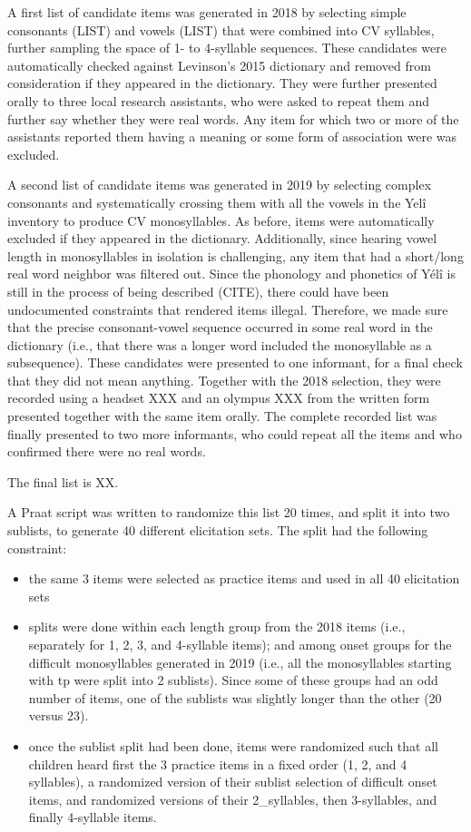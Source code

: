 \documentclass[english,,man,floatsintext]{apa6}
\providecommand{\tightlist}{%
  \setlength{\itemsep}{0pt}\setlength{\parskip}{0pt}}
\begin{document}
A first list of candidate items was generated in 2018 by selecting simple consonants (LIST) and vowels (LIST) that were combined into CV syllables, further sampling the space of 1- to 4-syllable sequences. These candidates were automatically checked against Levinson's 2015 dictionary and removed from consideration if they appeared in the dictionary. They were further presented orally to three local research assistants, who were asked to repeat them and further say whether they were real words. Any item for which two or more of the assistants reported them having a meaning or some form of association were was excluded.

A second list of candidate items was generated in 2019 by selecting complex consonants and systematically crossing them with all the vowels in the Yelî inventory to produce CV monosyllables. As before, items were automatically excluded if they appeared in the dictionary. Additionally, since hearing vowel length in monosyllables in isolation is challenging, any item that had a short/long real word neighbor was filtered out. Since the phonology and phonetics of Yélî is still in the process of being described (CITE), there could have been undocumented constraints that rendered items illegal. Therefore, we made sure that the precise consonant-vowel sequence occurred in some real word in the dictionary (i.e., that there was a longer word included the monosyllable as a subsequence). These candidates were presented to one informant, for a final check that they did not mean anything. Together with the 2018 selection, they were recorded using a headset XXX and an olympus XXX from the written form presented together with the same item orally. The complete recorded list was finally presented to two more informants, who could repeat all the items and who confirmed there were no real words.

The final list is XX.

A Praat script was written to randomize this list 20 times, and split it into two sublists, to generate 40 different elicitation sets. The split had the following constraint:

\begin{itemize}
\tightlist
\item
  the same 3 items were selected as practice items and used in all 40 elicitation sets
\item
  splits were done within each length group from the 2018 items (i.e., separately for 1, 2, 3, and 4-syllable items); and among onset groups for the difficult monosyllables generated in 2019 (i.e., all the monosyllables starting with tp were split into 2 sublists). Since some of these groups had an odd number of items, one of the sublists was slightly longer than the other (20 versus 23).
\item
  once the sublist split had been done, items were randomized such that all children heard first the 3 practice items in a fixed order (1, 2, and 4 syllables), a randomized version of their sublist selection of difficult onset items, and randomized versions of their 2\_syllables, then 3-syllables, and finally 4-syllable items.
\end{itemize}
\end{document}

